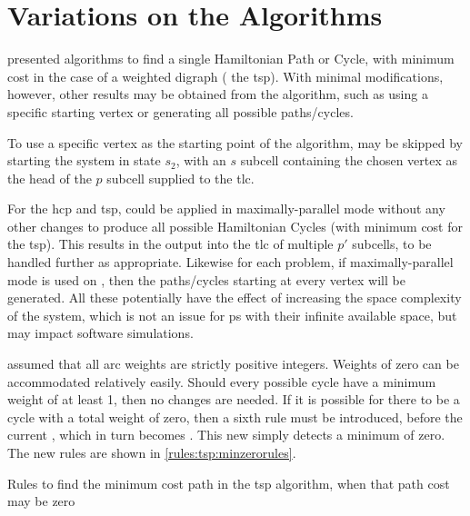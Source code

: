 \section{\label{sec:tsp:variations}Variations on the Algorithms}
 presented algorithms to find a single Hamiltonian Path or Cycle, with minimum cost in the case of a weighted digraph (\ie{} the \gls{tsp}).  With minimal modifications, however, other results may be obtained from the algorithm, such as using a specific starting vertex or generating all possible paths/cycles.

To use a specific vertex as the starting point of the algorithm,  may be skipped by starting the system in state \(s_2\), with an \(s\) subcell containing the chosen vertex as the head of the \(p\) subcell supplied to the \gls{tlc}.

For the \gls{hcp} and \gls{tsp},  could be applied in maximally-parallel mode without any other changes to produce all possible Hamiltonian Cycles (with minimum cost for the \gls{tsp}).  This results in the output into the \gls{tlc} of multiple \(p'\) subcells, to be handled further as appropriate.  Likewise for each problem, if maximally-parallel mode is used on , then the paths/cycles starting at every vertex will be generated.  All these potentially have the effect of increasing the space complexity of the system, which is not an issue for \gls{ps} with their infinite available space, but may impact software simulations.

 assumed that all arc weights are strictly positive integers.  Weights of zero can be accommodated relatively easily.  Should every possible cycle have a minimum weight of at least 1, then no changes are needed.  If it is possible for there to be a cycle with a total weight of zero, then a sixth rule must be introduced, before the current , which in turn becomes .  This new  simply detects a minimum of zero.  The new rules are shown in \cref{rules:tsp:minzerorules}.


\begin{cprulesetfloat}
\begin{cpruleset}
    
    
\end{cpruleset}
\caption[Rules to find the minimum cost path when it may be zero]{\label{rules:tsp:minzerorules}Rules to find the minimum cost path in the \gls{tsp} algorithm, when that path cost may be zero}
\end{cprulesetfloat}